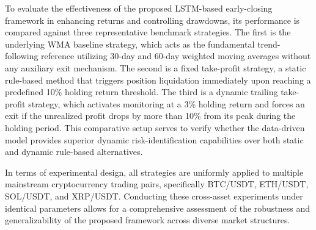 \documentclass[12pt]{article}
\begin{document}
To evaluate the effectiveness of the proposed LSTM-based early-closing framework in enhancing 
returns and controlling drawdowns, its performance is compared against three representative 
benchmark strategies. The first is the underlying WMA baseline strategy, which acts as the 
fundamental trend-following reference utilizing 30-day and 60-day weighted moving averages 
without any auxiliary exit mechanism. The second is a fixed take-profit strategy, a static 
rule-based method that triggers position liquidation immediately upon reaching a predefined 
10\% holding return threshold. The third is a dynamic trailing take-profit strategy, which 
activates monitoring at a 3\% holding return and forces an exit if the unrealized profit 
drops by more than 10\% from its peak during the holding period. This comparative setup 
serves to verify whether the data-driven model provides superior dynamic risk-identification 
capabilities over both static and dynamic rule-based alternatives. 

In terms of experimental design, all strategies are uniformly applied to multiple mainstream 
cryptocurrency trading pairs, specifically BTC/USDT, ETH/USDT, SOL/USDT, and XRP/USDT. 
Conducting these cross-asset experiments under identical parameters allows for a 
comprehensive assessment of the robustness and generalizability of the proposed framework 
across diverse market structures.




\end{document}
